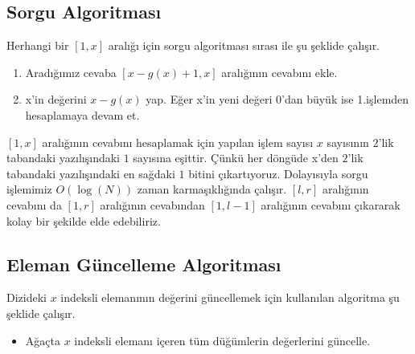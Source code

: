 \documentclass[12pt]{article}
\begin{document}
	\clearpage

    \subsection{Sorgu Algoritmas{\i}}
    
    Herhangi bir $[1,x]$ aral{\i}\u{g}{\i} i\c{c}in sorgu algoritmas{\i} s{\i}ras{\i} ile \c{s}u \c{s}eklide \c{c}al{\i}\c{s}{\i}r.
    
    \begin{enumerate}
        \item Arad{\i}\u{g}{\i}m{\i}z cevaba $[x - g(x) + 1,x]$ aral{\i}\u{g}{\i}n{\i}n cevab{\i}n{\i} ekle.
        \item x'in de\u{g}erini $x - g(x)$ yap. E\u{g}er x'in yeni de\u{g}eri $0$'dan b\"{u}y\"{u}k ise 1.i\c{s}lemden hesaplamaya devam et.  
    \end{enumerate}
    
    $[1,x]$ aral{\i}\u{g}{\i}n{\i}n cevab{\i}n{\i} hesaplamak i\c{c}in yap{\i}lan i\c{s}lem say{\i}s{\i} $x$ say{\i}s{\i}n{\i}n $2$'lik tabandaki yaz{\i}l{\i}\c{s}{\i}ndaki $1$ say{\i}s{\i}na e\c{s}ittir. \c{C}\"{u}nk\"{u} her d\"{o}ng\"{u}de x'den $2$'lik tabandaki yaz{\i}l{\i}\c{s}{\i}ndaki en sa\u{g}daki $1$ bitini \c{c}{\i}kart{\i}yoruz. Dolay{\i}s{\i}yla sorgu i\c{s}lemimiz $O(\log(N))$ zaman karma\c{s}{\i}kl{\i}\u{g}{\i}nda \c{c}al{\i}\c{s}{\i}r. $[l,r]$ aral{\i}\u{g}{\i}n{\i}n cevab{\i}n{\i} da $[1,r]$ aral{\i}\u{g}{\i}n{\i}n cevab{\i}ndan $[1,l - 1]$ aral{\i}\u{g}{\i}n{\i}n cevab{\i}n{\i} \c{c}{\i}kararak kolay bir \c{s}ekilde elde edebiliriz.
    
    
    \subsection{Eleman G\"{u}ncelleme Algoritmas{\i}}
    
    Dizideki $x$ indeksli eleman{\i}n{\i}n de\u{g}erini g\"{u}ncellemek  i\c{c}in kullan{\i}lan algoritma \c{s}u \c{s}eklide \c{c}al{\i}\c{s}{\i}r.
    
    \begin{itemize}
        \item A\u{g}a\c{c}ta $x$ indeksli eleman{\i} i\c{c}eren t\"{u}m d\"{u}\u{g}\"{u}mlerin de\u{g}erlerini g\"{u}ncelle.
    \end{itemize}
    
\end{document}

